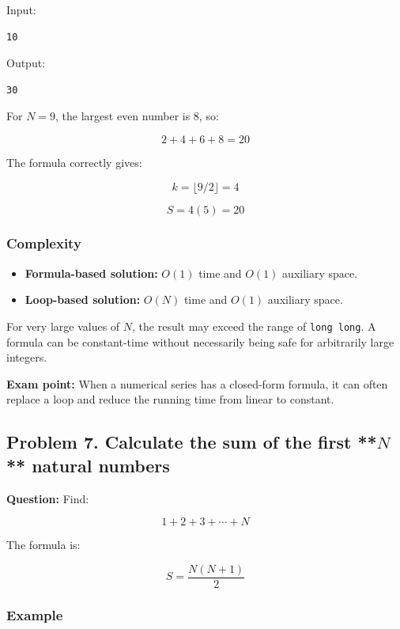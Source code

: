 Input:

\begin{lstlisting}[style=pseudocode]
10
\end{lstlisting}

Output:

\begin{lstlisting}[style=pseudocode]
30
\end{lstlisting}

For $N=9$, the largest even number is 8, so:


\[
2+4+6+8=20
\]


The formula correctly gives:


\[
k=\lfloor9/2\rfloor=4
\]



\[
S=4(5)=20
\]


\subsubsection{Complexity}

\begin{itemize}
    \item \textbf{Formula-based solution:} $O(1)$ time and $O(1)$ auxiliary space.
    \item \textbf{Loop-based solution:} $O(N)$ time and $O(1)$ auxiliary space.
\end{itemize}

For very large values of $N$, the result may exceed the range of \texttt{long long}. A formula can be constant-time without necessarily being safe for arbitrarily large integers.

\textbf{Exam point:} When a numerical series has a closed-form formula, it can often replace a loop and reduce the running time from linear to constant.

\subsection{Problem 7. Calculate the sum of the first **$N$** natural numbers}

\textbf{Question:} Find:


\[
1+2+3+\cdots+N
\]


The formula is:


\[
\boxed{S=\frac{N(N+1)}2}
\]


\subsubsection{Example}

